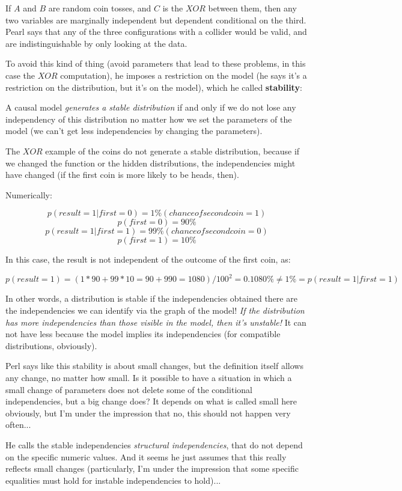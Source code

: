 If $A$ and $B$ are random coin tosses, and $C$ is the $XOR$ between them, then any two variables are marginally independent but dependent conditional on the third. Pearl says that any of the three configurations with a collider would be valid, and are indistinguishable by only looking at the data. 

To avoid this kind of thing (avoid parameters that lead to these problems, in this case the $XOR$ computation), he imposes a restriction on the model (he says it's a restriction on the distribution, but it's on the model), which he called \textbf{stability}: 

A causal model \textit{generates a stable distribution} if and only if we do not lose any independency of this distribution no matter how we set the parameters of the model (we can't get less independencies by changing the parameters).

The $XOR$ example of the coins do not generate a stable distribution, because if we changed the function or the hidden distributions, the independencies might have changed (if the first coin is more likely to be heads, then).

Numerically:

$$p(result = 1 | first = 0) = 1\% (chance of second coin = 1)$$
$$p(first = 0) = 90\%$$
$$p(result = 1 | first = 1) = 99\% (chance of second coin = 0)$$
$$p(first = 1) = 10\%$$

In this case, the result is not independent of the outcome of the first coin, as:

$$p(result = 1) = (1*90+99*10=90+990=1080)/100^2 = 0.1080\% \neq 1\% = p(result=1 | first = 1)$$

In other words, a distribution is stable if the independencies obtained there are the independencies we can identify via the graph of the model! \textit{If the distribution has more independencies than those visible in the model, then it's unstable!} It can not have less because the model implies its independencies (for compatible distributions, obviously).

Perl says like this stability is about small changes, but the definition itself allows any change, no matter how small. Is it possible to have a situation in which a small change of parameters does not delete some of the conditional independencies, but a big change does? It depends on what is called small here obviously, but I'm under the impression that no, this should not happen very often...

He calls the stable independencies \textit{structural independencies}, that do not depend on the specific numeric values. And it seems he just assumes that this really reflects small changes (particularly, I'm under the impression that some specific equalities must hold for instable independencies to hold)...


